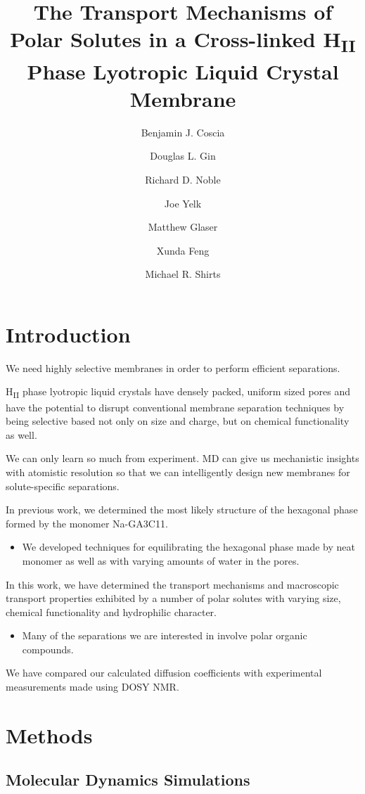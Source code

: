 \documentclass{article}
\title{The Transport Mechanisms of Polar Solutes in a Cross-linked H\textsubscript{II} Phase Lyotropic Liquid Crystal Membrane}
\author{Benjamin J. Coscia \and Douglas L. Gin \and Richard D. Noble \and Joe Yelk \and Matthew Glaser \and Xunda Feng \and Michael R. Shirts}
\begin{document}
%  
  \graphicspath{{./figures/}}
  \maketitle
  \section{Introduction}
  
  We need highly selective membranes in order to perform efficient separations.

  H\textsubscript{II} phase lyotropic liquid crystals have densely packed, uniform
  sized pores and have the potential to disrupt conventional membrane separation
  techniques by being selective based not only on size and charge, but on chemical
  functionality as well.


  We can only learn so much from experiment. MD can give us mechanistic insights with
  atomistic resolution so that we can intelligently design new membranes for 
  solute-specific separations.

  In previous work, we determined the most likely structure of the hexagonal phase 
  formed by the monomer Na-GA3C11.
  \begin{itemize}
  	\item We developed techniques for equilibrating the hexagonal phase made by
	neat monomer as well as with varying amounts of water in the pores.
  \end{itemize} 

  In this work, we have determined the transport mechanisms and macroscopic transport 
  properties exhibited by a number of polar solutes with varying size, chemical 
  functionality and hydrophilic character.
  \begin{itemize}
	\item Many of the separations we are interested in involve polar organic 
	compounds.
  \end{itemize} 

  We have compared our calculated diffusion coefficients with experimental measurements
  made using DOSY NMR. 

  \section{Methods}

  \subsection{Molecular Dynamics Simulations}
  
\end{document}
